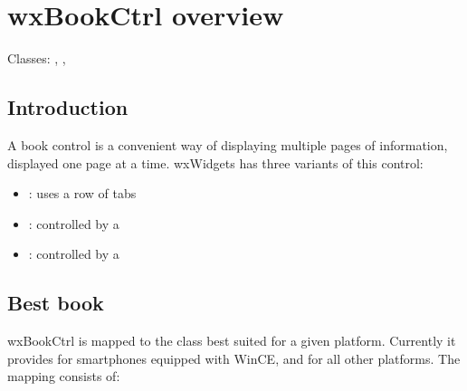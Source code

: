 
\section{wxBookCtrl overview}\label{wxbookctrloverview}

Classes: , , 

\subsection{Introduction}\label{wxbookctrlintro}

A book control is a convenient way of displaying multiple pages of information,
displayed one page at a time. wxWidgets has three variants of this control:

\begin{itemize}\itemsep=0pt
\item {}: uses a row of tabs
\item {}: controlled by a 
\item {}: controlled by a 
\end{itemize}

\subsection{Best book}\label{wxbestbookctrl}

wxBookCtrl is mapped to the class best suited for a given platform.
Currently it provides  for smartphones equipped with
WinCE, and  for all other platforms. The mapping consists of:

